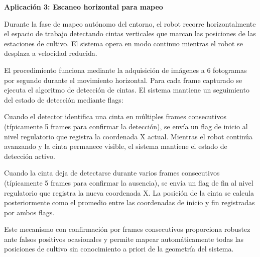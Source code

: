 \textbf{Aplicación 3: Escaneo horizontal para mapeo}

Durante la fase de mapeo autónomo del entorno, el robot recorre horizontalmente el espacio de trabajo detectando cintas verticales que marcan las posiciones de las estaciones de cultivo. El sistema opera en modo continuo mientras el robot se desplaza a velocidad reducida.

El procedimiento funciona mediante la adquisición de imágenes a 6 fotogramas por segundo durante el movimiento horizontal. Para cada frame capturado se ejecuta el algoritmo de detección de cintas. El sistema mantiene un seguimiento del estado de detección mediante flags:

Cuando el detector identifica una cinta en múltiples frames consecutivos (típicamente 5 frames para confirmar la detección), se envía un flag de inicio al nivel regulatorio que registra la coordenada X actual. Mientras el robot continúa avanzando y la cinta permanece visible, el sistema mantiene el estado de detección activo.

Cuando la cinta deja de detectarse durante varios frames consecutivos (típicamente 5 frames para confirmar la ausencia), se envía un flag de fin al nivel regulatorio que registra la nueva coordenada X. La posición de la cinta se calcula posteriormente como el promedio entre las coordenadas de inicio y fin registradas por ambos flags.

Este mecanismo con confirmación por frames consecutivos proporciona robustez ante falsos positivos ocasionales y permite mapear automáticamente todas las posiciones de cultivo sin conocimiento a priori de la geometría del sistema.